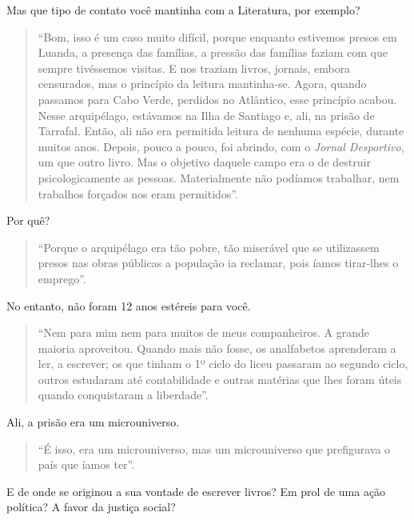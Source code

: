 \documentclass[
  letterpaper,
  DIV=11,
  numbers=noendperiod]{scrreprt}
\begin{document}
Mas que tipo de contato você mantinha com a Literatura, por exemplo?

\begin{quote}
``Bom, isso é um caso muito difícil, porque enquanto estivemos presos em
Luanda, a presença das famílias, a pressão das famílias faziam com que
sempre tivéssemos visitas. E nos traziam livros, jornais, embora
censurados, mas o princípio da leitura mantinha-se. Agora, quando
passamos para Cabo Verde, perdidos no Atlântico, esse princípio acabou.
Nesse arquipélago, estávamos na Ilha de Santiago e, ali, na prisão de
Tarrafal. Então, ali não era permitida leitura de nenhuma espécie,
durante muitos anos. Depois, pouco a pouco, foi abrindo, com o
\emph{Jornal Desportivo}, um que outro livro. Mas o objetivo daquele
campo era o de destruir psicologicamente as pessoas. Materialmente não
podíamos trabalhar, nem trabalhos forçados nos eram permitidos''.
\end{quote}

Por quê?

\begin{quote}
``Porque o arquipélago era tão pobre, tão miserável que se utilizassem
presos nas obras públicas a população ia reclamar, pois íamos tirar-lhes
o emprego''.
\end{quote}

No entanto, não foram 12 anos estéreis para você.

\begin{quote}
``Nem para mim nem para muitos de meus companheiros. A grande maioria
aproveitou. Quando mais não fosse, os analfabetos aprenderam a ler, a
escrever; os que tinham o 1º ciclo do liceu passaram ao segundo ciclo,
outros estudaram até contabilidade e outras matérias que lhes foram
úteis quando conquistaram a liberdade''.
\end{quote}

Ali, a prisão era um microuniverso.

\begin{quote}
``É isso, era um microuniverso, mas um microuniverso que prefigurava o
país que íamos ter''.
\end{quote}

E de onde se originou a sua vontade de escrever livros? Em prol de uma
ação política? A favor da justiça social?
\end{document}
